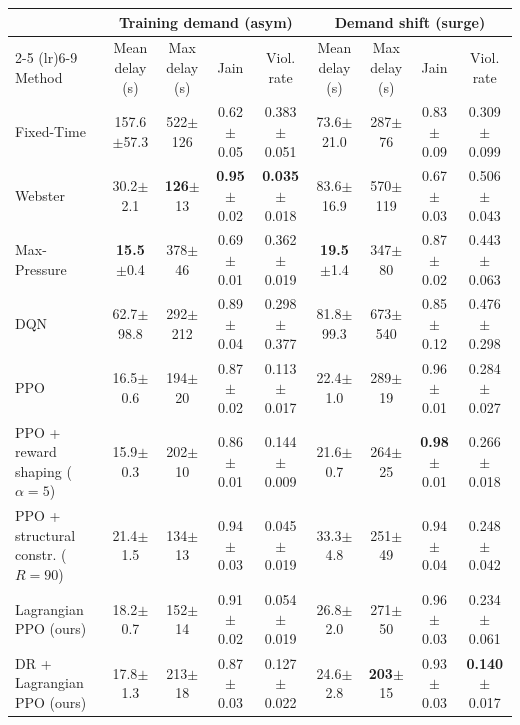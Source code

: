 \begin{tabular}{lcccccccc}
\toprule
 & \multicolumn{4}{c}{Training demand (asym)} & \multicolumn{4}{c}{Demand shift (surge)} \\
\cmidrule(lr){2-5} \cmidrule(lr){6-9}
Method & Mean delay (s) & Max delay (s) & Jain & Viol. rate & Mean delay (s) & Max delay (s) & Jain & Viol. rate \\
\midrule
Fixed-Time & 157.6\tiny{$\pm$57.3} & 522\tiny{$\pm$126} & 0.62\tiny{$\pm$0.05} & 0.383\tiny{$\pm$0.051} & 73.6\tiny{$\pm$21.0} & 287\tiny{$\pm$76} & 0.83\tiny{$\pm$0.09} & 0.309\tiny{$\pm$0.099} \\
Webster & 30.2\tiny{$\pm$2.1} & \textbf{126}\tiny{$\pm$13} & \textbf{0.95}\tiny{$\pm$0.02} & \textbf{0.035}\tiny{$\pm$0.018} & 83.6\tiny{$\pm$16.9} & 570\tiny{$\pm$119} & 0.67\tiny{$\pm$0.03} & 0.506\tiny{$\pm$0.043} \\
Max-Pressure & \textbf{15.5}\tiny{$\pm$0.4} & 378\tiny{$\pm$46} & 0.69\tiny{$\pm$0.01} & 0.362\tiny{$\pm$0.019} & \textbf{19.5}\tiny{$\pm$1.4} & 347\tiny{$\pm$80} & 0.87\tiny{$\pm$0.02} & 0.443\tiny{$\pm$0.063} \\
DQN & 62.7\tiny{$\pm$98.8} & 292\tiny{$\pm$212} & 0.89\tiny{$\pm$0.04} & 0.298\tiny{$\pm$0.377} & 81.8\tiny{$\pm$99.3} & 673\tiny{$\pm$540} & 0.85\tiny{$\pm$0.12} & 0.476\tiny{$\pm$0.298} \\
PPO & 16.5\tiny{$\pm$0.6} & 194\tiny{$\pm$20} & 0.87\tiny{$\pm$0.02} & 0.113\tiny{$\pm$0.017} & 22.4\tiny{$\pm$1.0} & 289\tiny{$\pm$19} & 0.96\tiny{$\pm$0.01} & 0.284\tiny{$\pm$0.027} \\
PPO + reward shaping ($\alpha{=}5$) & 15.9\tiny{$\pm$0.3} & 202\tiny{$\pm$10} & 0.86\tiny{$\pm$0.01} & 0.144\tiny{$\pm$0.009} & 21.6\tiny{$\pm$0.7} & 264\tiny{$\pm$25} & \textbf{0.98}\tiny{$\pm$0.01} & 0.266\tiny{$\pm$0.018} \\
PPO + structural constr. ($R{=}90$) & 21.4\tiny{$\pm$1.5} & 134\tiny{$\pm$13} & 0.94\tiny{$\pm$0.03} & 0.045\tiny{$\pm$0.019} & 33.3\tiny{$\pm$4.8} & 251\tiny{$\pm$49} & 0.94\tiny{$\pm$0.04} & 0.248\tiny{$\pm$0.042} \\
Lagrangian PPO (ours) & 18.2\tiny{$\pm$0.7} & 152\tiny{$\pm$14} & 0.91\tiny{$\pm$0.02} & 0.054\tiny{$\pm$0.019} & 26.8\tiny{$\pm$2.0} & 271\tiny{$\pm$50} & 0.96\tiny{$\pm$0.03} & 0.234\tiny{$\pm$0.061} \\
DR + Lagrangian PPO (ours) & 17.8\tiny{$\pm$1.3} & 213\tiny{$\pm$18} & 0.87\tiny{$\pm$0.03} & 0.127\tiny{$\pm$0.022} & 24.6\tiny{$\pm$2.8} & \textbf{203}\tiny{$\pm$15} & 0.93\tiny{$\pm$0.03} & \textbf{0.140}\tiny{$\pm$0.017} \\
\bottomrule
\end{tabular}